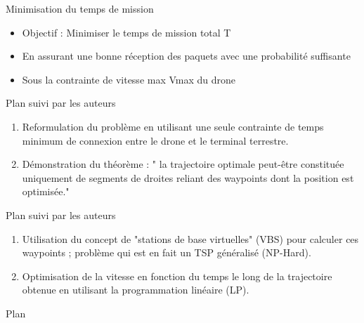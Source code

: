 \begin{frame}{Minimisation du temps de mission}


\begin{itemize}
	\item Objectif : Minimiser le temps de mission total T
	\item En assurant une bonne réception des paquets avec une probabilité suffisante
	\item Sous la contrainte de vitesse max Vmax du drone 
\end{itemize}

\end{frame}


\newcommand{\asuivre}{\setcounter{sauvegardeenumi}{\theenumi}}
\newcommand{\suite}{\setcounter{enumi}{\thesauvegardeenumi}}

\begin{frame}{Plan suivi par les auteurs}

\begin{enumerate}
	
	\item Reformulation du problème en utilisant une seule contrainte
	de temps minimum de connexion entre le drone et le terminal terrestre.	
	\item Démonstration du théorème : " la trajectoire optimale
	peut-être constituée uniquement de segments de droites reliant des
	waypoints dont la position est optimisée."

	
\end{enumerate}
\asuivre
\end{frame}

\begin{frame}{Plan suivi par les auteurs}
 
\begin{enumerate}
	\suite
	\item Utilisation du concept de "stations de base virtuelles" (VBS) pour calculer ces waypoints ;  problème qui est en fait un TSP généralisé (NP-Hard).

	\item Optimisation de la vitesse en fonction du temps le long de la trajectoire obtenue
	en utilisant la programmation linéaire (LP).

\end{enumerate}

\end{frame}


\begin{frame}{Plan}
	\tableofcontents
\end{frame}
